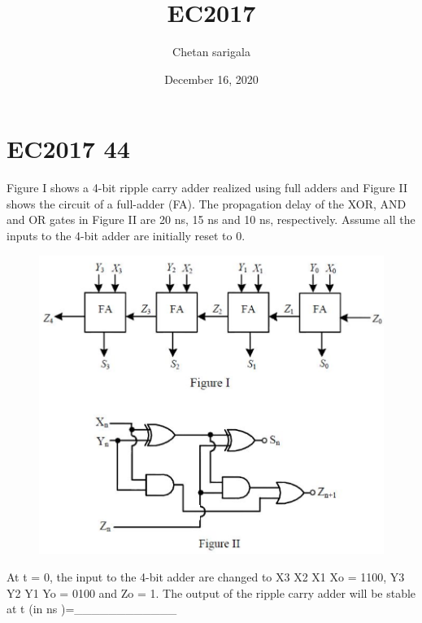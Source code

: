 \documentclass{article}
\title{EC2017}
\author{Chetan sarigala }
\date{December 16, 2020}
\begin{document}
\maketitle

\section{EC2017 44 }

  

         \begin{question}
            Figure I shows a 4-bit ripple carry adder realized using full adders and Figure II shows the circuit of a full-adder (FA). The propagation delay of the XOR, AND and OR gates in Figure II are 20 ns, 15 ns and 10 ns, respectively. Assume all the inputs to the 4-bit adder are initially reset to 0.
\begin{figure}[!ht]
\centerline{\includegraphics[scale=2.5]{Q-144.PNG}}
	
	\label{Q-144.PNG}
\end{figure}

At t = 0, the input to the 4-bit adder are changed to X3 X2 X1 Xo = 1100, Y3 Y2 Y1 Yo = 0100 and Zo = 1. The output of the ripple carry adder will be stable at t (in ns  )=____________



         \end{question}
\end{document}
